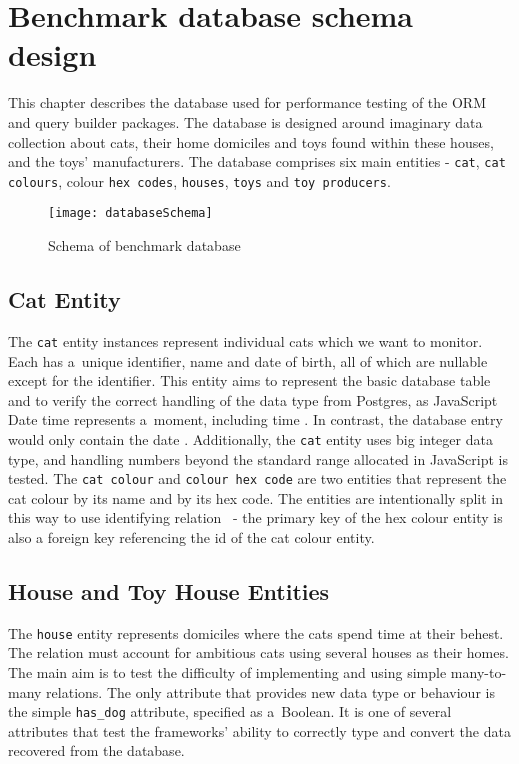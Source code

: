 \chapter{Benchmark database schema design}\label{ch:database}

This chapter describes the database used for performance testing of the ORM and
query builder packages. The database is designed around imaginary data
collection about cats, their home domiciles and toys found within these houses,
and the toys' manufacturers. The database comprises six main entities -
\texttt{cat}, \texttt{cat colours}, colour \texttt{hex codes}, \texttt{houses},
\texttt{toys} and \texttt{toy producers}.

\begin{figure}[b]
    \centering
    \texttt{[image: databaseSchema]}
    \caption{Schema of benchmark database}
\end{figure}

\section{Cat Entity}
The \texttt{cat} entity instances represent individual cats which we want to
monitor. Each has a~unique identifier, name and date of birth, all of which are
nullable except for the identifier. This entity aims to represent the basic
database table and to verify the correct handling of the data type from
Postgres, as JavaScript Date time represents a~moment, including time
\cite{JavaScript-Date-MDN}. In contrast, the database entry would only contain
the date \cite{Date/TimeTypes_Postgres}. Additionally, the \texttt{cat} entity
uses big integer data type, and handling numbers beyond the standard range
allocated in JavaScript is tested. The \texttt{cat colour} and \texttt{colour
hex code} are two entities that represent the cat colour by its name and by its
hex code. The entities are intentionally split in this way to use identifying
relation~\cite{Karwin_2010} - the primary key of the hex colour entity is also a
foreign key referencing the id of the cat colour entity.

\section{House and Toy House Entities}
The \texttt{house} entity represents domiciles where the cats spend time at
their behest. The relation must account for ambitious cats using several houses
as their homes. The main aim is to test the difficulty of implementing and using
simple many-to-many relations. The only attribute that provides new data type or
behaviour is the simple \verb|has_dog| attribute, specified as a~Boolean. It is
one of several attributes that test the frameworks' ability to correctly type
and convert the data recovered from the database.


